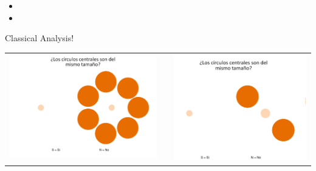 \documentclass[final]{beamer}
\newlength{\twocolwid}
\begin{document}
\begin{frame}[t]
\begin{columns}[t]
\begin{column}{\twocolwid}
\begin{columns}[t,totalwidth=\twocolwid]
\begin{column}{\twocolwid}
\begin{itemize}
\item
\item
\end{itemize}




\begin{alertblock}{Classical Analysis!}



\begin{center}
\begin{tabular}{ccc}
\includegraphics[width=0.2\linewidth]{Figures/MainTask.png} & \hfill & \includegraphics[width=0.2\linewidth]{Figures/MainTask2.png}
\end{tabular}
\end{center}



\end{alertblock}


\end{column} %


\end{columns}
\end{column}
\end{columns}
\end{frame}
\end{document}
